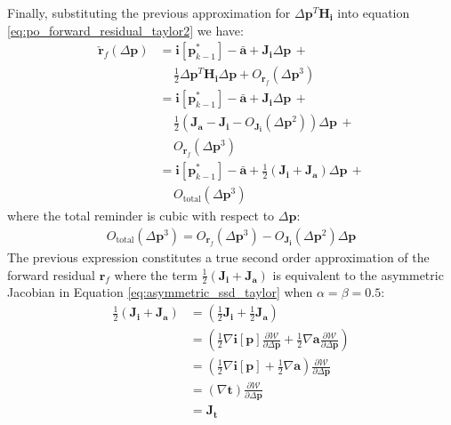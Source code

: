 Finally, substituting the previous approximation for $\Delta\mathbf{p}^T \mathbf{H}_\mathbf{i}$ into equation \ref{eq:po_forward_residual_taylor2} we have:
\begin{equation}
    \begin{aligned}
		\check{\mathbf{r}}_f(\Delta\mathbf{p}) & = \mathbf{i}[\mathbf{p}_{k-1}^*] - \bar{\mathbf{a}} + \mathbf{J}_\mathbf{i}\Delta\mathbf{p} \, +
		\\
		& \quad \, \frac{1}{2} \Delta\mathbf{p}^T\mathbf{H}_\mathbf{i}\Delta\mathbf{p} + O_{\mathbf{r}_f}(\Delta\mathbf{p}^3)
		\\
		& = \mathbf{i}[\mathbf{p}_{k-1}^*] - \bar{\mathbf{a}} + \mathbf{J}_\mathbf{i}\Delta\mathbf{p} \, +
		\\
		& \quad \, \frac{1}{2} \left( \mathbf{J}_\mathbf{a} - \mathbf{J}_\mathbf{i} - O_{\mathbf{J}_\mathbf{i}}(\Delta\mathbf{p}^2) \right) \Delta\mathbf{p} \, +
		\\
		& \quad \, O_{\mathbf{r}_f}(\Delta\mathbf{p}^3)
		\\
		& = \mathbf{i}[\mathbf{p}_{k-1}^*] - \bar{\mathbf{a}} + \frac{1}{2} \left( \mathbf{J}_\mathbf{i} + \mathbf{J}_\mathbf{a} \right) \Delta\mathbf{p} \, +
		\\
		& \quad \, O_{\textrm{total}}(\Delta\mathbf{p}^3)
    \label{eq:po_asymmetric_residual_approximation}
    \end{aligned}
\end{equation}
where the total reminder is cubic with respect to $\Delta \mathbf{p}$:
\begin{equation}
    \begin{aligned}
		O_{\textrm{total}}(\Delta\mathbf{p}^3) = O_{\mathbf{r}_f}(\Delta\mathbf{p}^3) - O_{\mathbf{J}_\mathbf{i}}(\Delta\mathbf{p}^2) \Delta\mathbf{p}
    \label{eq:po_asymmetric_residual_approximation}
    \end{aligned}
\end{equation}
The previous expression constitutes a true second order approximation of the forward residual $\mathbf{r}_f$ where the term $\frac{1}{2} \left( \mathbf{J}_\mathbf{i} + \mathbf{J}_\mathbf{a} \right)$ is equivalent to the asymmetric Jacobian in Equation \ref{eq:asymmetric_ssd_taylor} when $\alpha = \beta = 0.5$:
\begin{equation}
    \begin{aligned}
		\frac{1}{2} \left( \mathbf{J}_\mathbf{i} + \mathbf{J}_\mathbf{a} \right) & = \left( \frac{1}{2} \mathbf{J}_\mathbf{i} + \frac{1}{2} \mathbf{J}_\mathbf{a} \right)
		\\
		& = \left( \frac{1}{2} \nabla \mathbf{i}[\mathbf{p}] \frac{\partial\mathcal{W}}{\partial\Delta\mathbf{p}} + \frac{1}{2} \nabla \mathbf{a} \frac{\partial\mathcal{W}}{\partial\Delta\mathbf{p}} \right)
		\\
		& = \left( \frac{1}{2} \nabla \mathbf{i}[\mathbf{p}] + \frac{1}{2} \nabla \mathbf{a} \right) \frac{\partial\mathcal{W}}{\partial\Delta\mathbf{p}}
		\\
		& = \left( \nabla \mathbf{t} \right) \frac{\partial\mathcal{W}}{\partial\Delta\mathbf{p}}
		\\
		& = \mathbf{J}_\mathbf{t}
    \label{eq:equivalent_jacobians}
    \end{aligned}
\end{equation}
